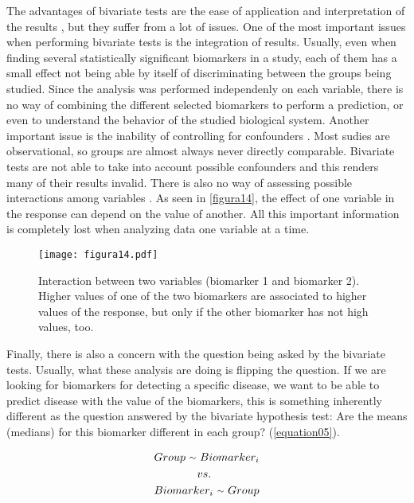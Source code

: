 The advantages of bivariate tests are the ease of application and interpretation of the results \parencite{vetter2018unadjusted}, but they suffer from a lot of issues. One of the most important issues when performing bivariate tests is the integration of results. Usually, even when finding several statistically significant biomarkers in a study, each of them has a small effect not being able by itself of discriminating between the groups being studied. Since the analysis was performed independenly on each variable, there is no way of combining the different selected biomarkers to perform a prediction, or even to understand the behavior of the studied biological system. Another important issue is the inability of controlling for confounders \parencite{heinze2017five}. Most sudies are observational, so groups are almost always never directly comparable. Bivariate tests are not able to take into account possible confounders and this renders many of their results invalid. There is also no way of assessing possible interactions among variables \parencite{hassall2018beyond}. As seen in \autoref{figura14}, the effect of one variable in the response can depend on the value of another. All this important information is completely lost when analyzing data one variable at a time.

\begin{figure}[hbtp]
	\centering
\texttt{[image: figura14.pdf]}
\caption{Interaction between two variables (biomarker 1 and biomarker 2). Higher values of one of the two biomarkers are associated to higher values of the response, but only if the other biomarker has not high values, too.}
\label{figura14}
\end{figure}

Finally, there is also a concern with the question being asked by the bivariate tests. Usually, what these analysis are doing is flipping the question. If we are looking for biomarkers for detecting a specific disease, we want to be able to predict disease with the value of the biomarkers, this is something inherently different as the question answered by the bivariate hypothesis test: Are the means (medians) for this biomarker different in each group? (\autoref{equation05}). 

\begin{equation}
\label{equation05}
\begin{split}
    Group\ {\raise.17ex\hbox{$\scriptstyle\sim$}}\ Biomarker_i \\
    vs. \phantom{MMMM}  \\
    Biomarker_i\ {\raise.17ex\hbox{$\scriptstyle\sim$}}\ Group
\end{split}
\end{equation}

